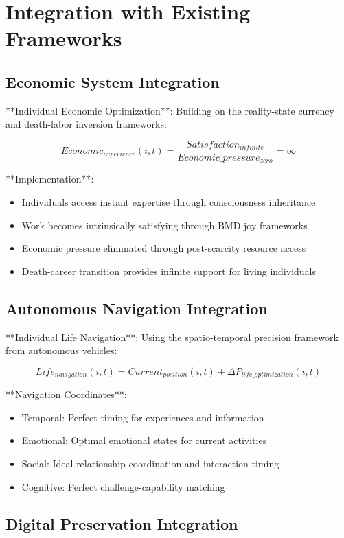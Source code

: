 \documentclass[12pt,a4paper]{article}
\begin{document}
\section{Integration with Existing Frameworks}

\subsection{Economic System Integration}

**Individual Economic Optimization**:
Building on the reality-state currency and death-labor inversion frameworks:

$$Economic_{experience}(i,t) = \frac{Satisfaction_{infinite}}{Economic\_pressure_{zero}} = \infty$$

**Implementation**:
\begin{itemize}
\item Individuals access instant expertise through consciousness inheritance
\item Work becomes intrinsically satisfying through BMD joy frameworks
\item Economic pressure eliminated through post-scarcity resource access
\item Death-career transition provides infinite support for living individuals
\end{itemize}

\subsection{Autonomous Navigation Integration}

**Individual Life Navigation**:
Using the spatio-temporal precision framework from autonomous vehicles:

$$Life_{navigation}(i,t) = Current_{position}(i,t) + \Delta P_{life\_optimization}(i,t)$$

**Navigation Coordinates**:
\begin{itemize}
\item Temporal: Perfect timing for experiences and information
\item Emotional: Optimal emotional states for current activities
\item Social: Ideal relationship coordination and interaction timing
\item Cognitive: Perfect challenge-capability matching
\end{itemize}

\subsection{Digital Preservation Integration}
\end{document}
